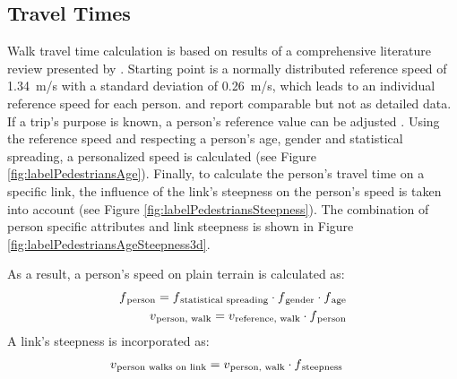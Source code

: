 \subsection{Travel Times} \label{sec:TravelTimes}
Walk travel time calculation is based on results of a comprehensive literature review presented by \citet{Weidmann_TechRep_IVT_1992}. Starting point is a normally distributed reference speed of 1.34~m/s with a standard deviation of 0.26~m/s, which leads to an individual reference speed for each person. \citet{HBS_2009} and \citet{HCM_2010} report comparable but not as detailed data. If a trip's purpose is known, a person's reference value can be adjusted \citep[commuting 1.49~m/s, shopping 1.16~m/s, leisure 1.10~m/s; see][]{HBS_2009}. Using the reference speed and respecting a person's age, gender and statistical spreading, a personalized speed is calculated (see Figure \ref{fig:labelPedestriansAge}). Finally, to calculate the person's travel time on a specific link, the influence of the link's steepness on the person's speed is taken into account (see Figure \ref{fig:labelPedestriansSteepness}). The combination of person specific attributes and link steepness is shown in Figure \ref{fig:labelPedestriansAgeSteepness3d}.

As a result, a person's speed on plain terrain is calculated as:\begin{align}
	f\textsubscript{person} = f\textsubscript{statistical~spreading} \cdot f\textsubscript{gender} \cdot f\textsubscript{age}\\
	v\textsubscript{person, walk} = v\textsubscript{reference, walk} \cdot f\textsubscript{person}
\end{align}
A link's steepness is incorporated as:
\begin{align}
    v\textsubscript{person~walks~on~link} &= v\textsubscript{person, walk} \cdot f\textsubscript{steepness}
\end{align}

